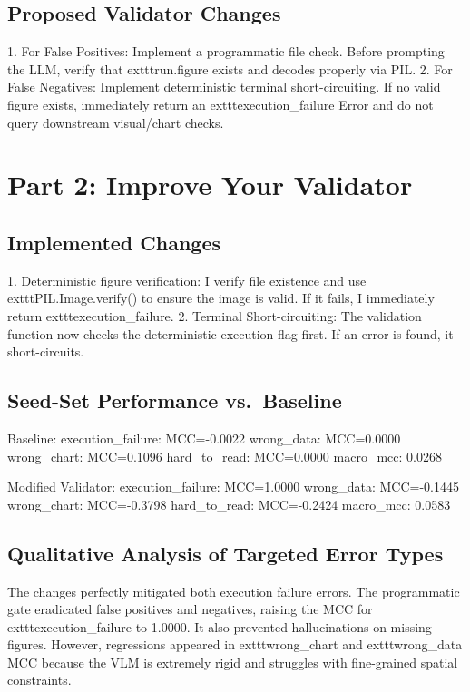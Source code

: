 \documentclass[11pt]{article}
\begin{document}
\subsection{Proposed Validator Changes}
1. For False Positives: Implement a programmatic file check. Before prompting the LLM, verify that 	exttt{run.figure} exists and decodes properly via PIL.
2. For False Negatives: Implement deterministic terminal short-circuiting. If no valid figure exists, immediately return an 	exttt{execution\_failure} Error and do not query downstream visual/chart checks.

\section{Part 2: Improve Your Validator}

\subsection{Implemented Changes}
1. Deterministic figure verification: I verify file existence and use 	exttt{PIL.Image.verify()} to ensure the image is valid. If it fails, I immediately return 	exttt{execution\_failure}.
2. Terminal Short-circuiting: The validation function now checks the deterministic execution flag first. If an error is found, it short-circuits.

\subsection{Seed-Set Performance vs.\ Baseline}
Baseline:
execution\_failure: MCC=-0.0022
wrong\_data: MCC=0.0000
wrong\_chart: MCC=0.1096
hard\_to\_read: MCC=0.0000
macro\_mcc: 0.0268

Modified Validator:
execution\_failure: MCC=1.0000
wrong\_data: MCC=-0.1445
wrong\_chart: MCC=-0.3798
hard\_to\_read: MCC=-0.2424
macro\_mcc: 0.0583

\subsection{Qualitative Analysis of Targeted Error Types}
The changes perfectly mitigated both execution failure errors. The programmatic gate eradicated false positives and negatives, raising the MCC for 	exttt{execution\_failure} to 1.0000. It also prevented hallucinations on missing figures. However, regressions appeared in 	exttt{wrong\_chart} and 	exttt{wrong\_data} MCC because the VLM is extremely rigid and struggles with fine-grained spatial constraints.
\end{document}
